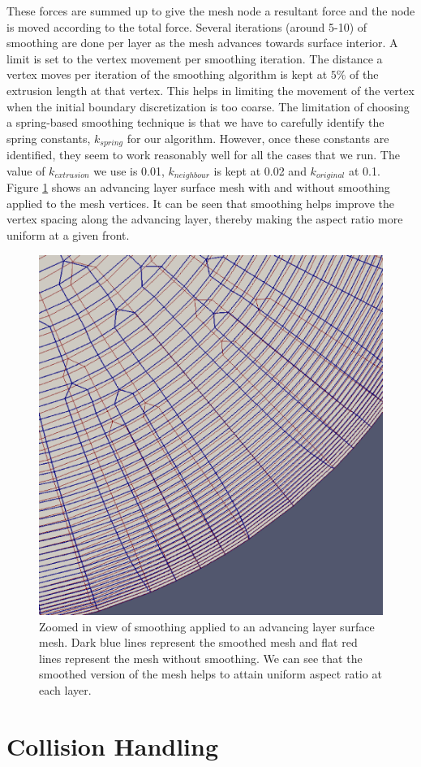These forces are summed up to give the mesh node a resultant force and the node is moved according to the total force. Several iterations (around 5-10) of smoothing are done per layer as the mesh advances towards surface interior. A limit is set to the vertex movement per smoothing iteration. The distance a vertex moves per iteration of the smoothing algorithm is kept at $5\%$ of the extrusion length at that vertex. This helps in limiting the movement of the vertex when the initial boundary discretization is too coarse. The limitation of choosing a spring-based smoothing technique is that we have to carefully identify the spring constants, $\mathit{k_{spring}}$ for our algorithm. However, once these constants are identified, they seem to work reasonably well for all the cases that we run. The value of $\mathit{k_{extrusion}}$ we use is 0.01, $k_{neighbour}$ is kept at 0.02 and $\mathit{k_{original}}$ at 0.1. Figure \ref{fig-smoothing-cylinder} shows an advancing layer surface mesh with and without smoothing applied to the mesh vertices. It can be seen that smoothing helps improve the vertex spacing along the advancing layer, thereby making the aspect ratio more uniform at a given front.

\begin{figure}
\centering
\includegraphics[width=0.4\linewidth]{img/m2/smoothing/smoothing-comparison-cylinder-cap.eps}
\caption[Comparison of a surface mesh before and after smoothing is applied.]{Zoomed in view of smoothing applied to an advancing layer surface mesh. Dark blue lines represent the smoothed mesh and flat red lines represent the mesh without smoothing. We can see that the smoothed version of the mesh helps to attain uniform aspect ratio at each layer.}
\label{fig-smoothing-cylinder}
\end{figure}

\section{Collision Handling}
\label{collisionHandling}

